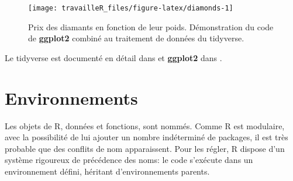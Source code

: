 \documentclass[
  12pt,
  french,
  a4paper,
  extrafontsizes,onecolumn,openright
  ]{memoir}
\newenvironment{Shaded}{\begin{snugshade}}{\end{snugshade}}
\newcommand{\CommentTok}[1]{\textcolor[rgb]{0.56,0.35,0.01}{\textit{#1}}}
\newcommand{\DataTypeTok}[1]{\textcolor[rgb]{0.13,0.29,0.53}{#1}}
\newcommand{\FloatTok}[1]{\textcolor[rgb]{0.00,0.00,0.81}{#1}}
\newcommand{\KeywordTok}[1]{\textcolor[rgb]{0.13,0.29,0.53}{\textbf{#1}}}
\newcommand{\NormalTok}[1]{#1}
\newcommand{\OperatorTok}[1]{\textcolor[rgb]{0.81,0.36,0.00}{\textbf{#1}}}
\newcommand{\StringTok}[1]{\textcolor[rgb]{0.31,0.60,0.02}{#1}}
\begin{document}
\begin{Shaded}
\end{Shaded}

\begin{figure}

{\centering \texttt{[image: travailleR\_files/figure-latex/diamonds-1]} 

}

\caption{Prix des diamants en fonction de leur poids. Démonstration du code de \textbf{ggplot2} combiné au traitement de données du tidyverse.}\label{fig:diamonds}
\end{figure}

\normalsize

Le tidyverse est documenté en détail dans \textcite{Wickham2016} et \textbf{ggplot2} dans \textcite{Wickham2017}.

\hypertarget{sec:environnements}{%
\section{Environnements}\label{sec:environnements}}

Les objets de R, données et fonctions, sont nommés.
Comme R est modulaire, avec la possibilité de lui ajouter un nombre indéterminé de packages, il est très probable que des conflits de nom apparaissent.
Pour les régler, R dispose d'un système rigoureux de précédence des noms: le code s'exécute dans un environnement défini, héritant d'environnements parents.
\end{document}

